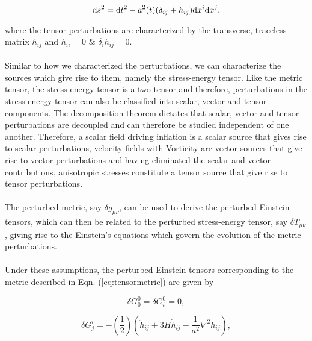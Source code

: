 \documentclass[12pt,a4paper,oneside]{book}
\begin{document}
\begin{equation}\label{eq:tensormetric}
{\rm d}s^2 = {\rm d}t^2 - a^2(t)(\delta_{ij} + h_{ij}){\rm d}x^i{\rm d}x^j,
\end{equation}

\noindent where the tensor perturbations are characterized by the transverse, traceless 
matrix $h_{ij}$ and $h_{ii}=0$ \& $\delta_i h_{ij}=0$. %

\paragraph*{} Similar to how we characterized the perturbations, we can 
characterize the sources which give rise to them, namely the stress-energy 
tensor. Like the metric tensor, the stress-energy tensor is a two tensor and 
therefore, perturbations in the stress-energy tensor can also be classified into 
scalar, vector and tensor components. The decomposition theorem dictates  
that scalar, vector and tensor perturbations are decoupled and can therefore 
be studied independent of one another. Therefore, a scalar field driving inflation is a scalar 
source that gives rise to scalar perturbations, 
velocity fields with Vorticity are vector sources that give rise to vector perturbations 
and having eliminated the scalar and vector contributions, anisotropic stresses constitute a tensor 
source that give rise to tensor perturbations.

\paragraph*{} The perturbed metric, say $\delta g_{\mu\nu}$, can be used to 
derive the perturbed Einstein tensors, which can then be related to the 
perturbed stress-energy tensor, say $\delta T_{\mu\nu}$, giving rise to 
the Einstein's equations which govern the evolution of the metric perturbations. 

\paragraph*{} Under these assumptions, the perturbed Einstein tensors 
corresponding to the metric described in Eqn. (\ref{eq:tensormetric}) are 
given by

\begin{equation}
\delta G^0_0 = \delta G^0_i = 0,
\end{equation}

\begin{equation}
\delta G^i_j = -\left(\frac{1}{2}\right)\left(\ddot{h}_{ij} + 3H\dot{h}_{ij} 
- \frac{1}{a^2}\nabla ^2h_{ij}\right),
\end{equation}
\end{document}
